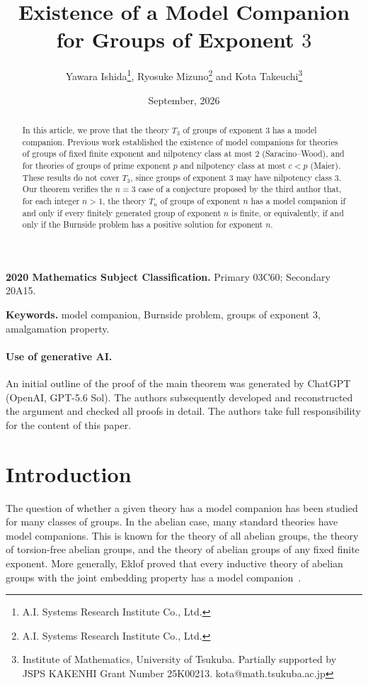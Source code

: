 \documentclass[11pt,reqno]{article}
\title{Existence of a Model Companion for Groups of Exponent $3$}
\author{Yawara Ishida\thanks{A.I. Systems Research Institute Co., Ltd.}, Ryosuke Mizuno\thanks{A.I. Systems Research Institute Co., Ltd.} and Kota Takeuchi\thanks{Institute of Mathematics, University of Tsukuba. Partially supported by JSPS KAKENHI
Grant Number 25K00213. kota@math.tsukuba.ac.jp}}
\date{September, 2026}
\theoremstyle{definition}
\theoremstyle{remark}
\begin{document}
\maketitle

\begin{abstract}
In this article, we prove that the theory $T_3$ of groups of exponent $3$ has a model
companion. Previous work established the existence of model companions
for theories of groups of fixed finite exponent and nilpotency class
at most $2$ (Saracino--Wood), and for theories of groups of prime exponent $p$ and
nilpotency class at most $c<p$ (Maier). These results do not cover $T_3$,
since groups of exponent $3$ may have nilpotency class $3$.
Our theorem verifies the $n=3$ case of a conjecture proposed by the third author that,
for each integer $n>1$, the theory $T_n$ of groups of exponent $n$
has a model companion if and only if every finitely generated group
of exponent $n$ is finite, or equivalently, if and only if the
Burnside problem has a positive solution for exponent $n$.
\end{abstract}

\medskip
\noindent\textbf{2020 Mathematics Subject Classification.}
Primary 03C60; Secondary 20A15.

\smallskip
\noindent\textbf{Keywords.}
model companion, Burnside problem, groups of exponent $3$, amalgamation property.

\paragraph{Use of generative AI.}
An initial outline of the proof of the main theorem was generated by ChatGPT (OpenAI, GPT-5.6 Sol).
The authors subsequently developed and reconstructed the argument
and checked all proofs in detail.
The authors take full responsibility for the content of this paper.

\section{Introduction}
\label{sec:introduction}
The question of whether a given theory has a model companion has been studied for many classes of groups.
In the abelian case, many standard theories have model companions.
This is known for the theory of all abelian groups, the theory of torsion-free abelian groups, and the theory of abelian groups of any fixed finite exponent.
More generally, Eklof proved that every inductive theory of abelian
groups with the joint embedding property has a model
companion~\cite{Eklof1972}.
\end{document}
